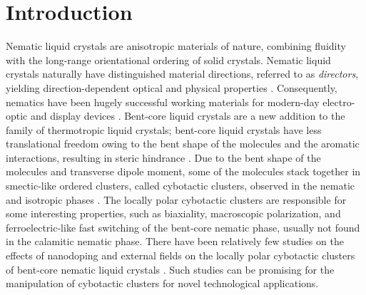\documentclass[reprint,amsfonts,amsmath,amssymb,aps,pre,floatfix,10pt]{revtex4-1}
\begin{document}
\section{Introduction}
Nematic liquid crystals are anisotropic materials of nature, combining fluidity with the long-range orientational ordering of solid crystals. Nematic liquid crystals naturally have distinguished material directions, referred to as \emph{directors}, yielding direction-dependent optical and physical properties \cite{de1993physics_1}. Consequently, nematics have been hugely successful working materials for modern-day electro-optic and display devices \cite{collings2019introduction_2, de1993physics_1}. Bent-core liquid crystals are a new addition to the family of thermotropic liquid crystals; bent-core liquid crystals have less translational freedom owing to the bent shape of the molecules and the aromatic interactions, resulting in steric hindrance \cite{marino2012dielectric_3, ghosh2014ferroelectric_4}. Due to the bent shape of the molecules and transverse dipole moment, some of the molecules stack together in smectic-like ordered clusters, called cybotactic clusters, observed in the nematic and isotropic phases \cite{bailey2009rheological_5}. The locally polar cybotactic clusters are responsible for some interesting properties, such as biaxiality, macroscopic polarization, and ferroelectric-like fast switching \cite{takezoe2006bent_6, francescangeli2014cybotactic_7, keith2010nematic_8, kumar2018ferroelectric_9} of the bent-core nematic phase, usually not found in the calamitic nematic phase. There have been relatively few studies on the effects of nanodoping and external fields on the locally polar cybotactic clusters of bent-core nematic liquid crystals \cite{kumar2018quantum_10,khan2017elastic_11,kumar2018nanodoping_12}. Such studies can be promising for the manipulation of cybotactic clusters for novel technological applications.
\end{document}
